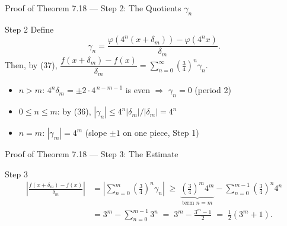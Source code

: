\documentclass[aspectratio=169,12pt,t]{beamer}
\begin{document}
{%
\begin{frame}{Proof of Theorem 7.18 --- Step 2: The Quotients $\gamma_n$}
  \begin{proofblock}{Step 2}
    Define
    \begin{equation}
      \gamma_n = \frac{\varphi(4^n(x + \delta_m)) - \varphi(4^n x)}{\delta_m}. \tag{39}
    \end{equation}
    Then, by (37),
    \(
      \dfrac{f(x + \delta_m) - f(x)}{\delta_m}
      = \displaystyle\sum_{n=0}^{\infty} \left(\tfrac34\right)^n \gamma_n.
    \)
  \end{proofblock}
  \begin{hlbox}
  \begin{itemize}
    \item $n > m$: \; $4^n \delta_m = \pm 2 \cdot 4^{\,n-m-1}$ is
      \alert{even} $\Rightarrow$ $\gamma_n = 0$ \; (period 2)
    \item $0 \le n \le m$: \; by (36), $|\gamma_n| \le 4^n |\delta_m| / |\delta_m| = 4^n$
    \item $n = m$: \; $|\gamma_m| = 4^m$ \; (slope $\pm 1$ on one piece, Step 1)
  \end{itemize}
  \end{hlbox}

\end{frame}

\begin{frame}{Proof of Theorem 7.18 --- Step 3: The Estimate}
  \begin{proofblock}{Step 3}
    \vspace{-0.6em}
    \begin{align*}
      \left|\frac{f(x + \delta_m) - f(x)}{\delta_m}\right|
      &= \left|\sum_{n=0}^{m} \left(\tfrac{3}{4}\right)^n \gamma_n\right|
      \;\ge\; \underbrace{\left(\tfrac34\right)^m 4^m}_{\text{term } n = m}
        - \sum_{n=0}^{m-1} \left(\tfrac34\right)^n 4^n \\
      &= 3^m - \sum_{n=0}^{m-1} 3^n
      \;=\; 3^m - \frac{3^m - 1}{2}
      \;=\; \boxed{\tfrac{1}{2}(3^m + 1)}.
    \end{align*}
  \end{proofblock}


\end{frame}}
\end{document}
